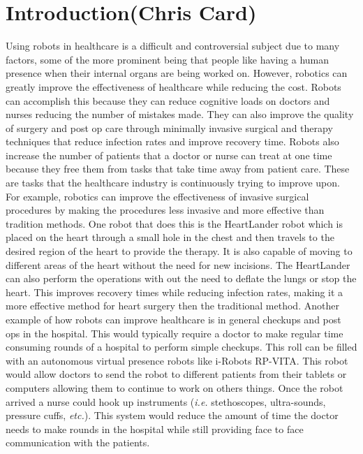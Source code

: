 \documentclass[11pt,conference]{IEEEtran}
\begin{document}
\section{Introduction(Chris Card)}

Using robots in healthcare is a difficult and controversial subject due to many factors, some of the more prominent being that people like having a human presence when their internal organs are being worked on.  However, robotics can greatly improve the effectiveness of healthcare while reducing the cost.  Robots can accomplish this because they can reduce cognitive loads on doctors and nurses reducing the number of 
mistakes made.  They can also improve the quality of surgery and post op care through minimally invasive surgical and therapy techniques that reduce infection rates and improve recovery time.  Robots also increase the number of patients that a doctor or nurse can treat at one time because they free them from tasks that take time away from patient care.  These are tasks that the healthcare industry is continuously trying to improve upon.
\newline
\indent For example, robotics can improve the effectiveness of invasive surgical procedures by making the procedures less invasive and more effective than tradition methods.  One robot that does this is the HeartLander robot which is placed on the heart through a small hole in 
the chest and then travels to the desired region of the heart to provide the therapy. It is also capable of moving to different areas of the heart without the need for new incisions.  The HeartLander can also perform the 
operations with out the need to deflate the lungs or stop the heart.  This improves recovery times while reducing infection rates, making it a more effective method for heart surgery then the traditional method.  
\newline
\indent Another example of how robots can improve healthcare is in general checkups and post ops in the hospital.  This would typically require a doctor to make regular time consuming rounds of a hospital to perform simple checkups.  This roll can be filled with an autonomous virtual presence robots like i-Robots RP-VITA.  This robot would allow doctors to send the robot to different patients from their tablets or computers allowing them to continue to work on others things.  Once the robot arrived a nurse could hook up instruments (\textit{i.e.} stethoscopes, ultra-sounds, pressure cuffs, \textit{etc.}).  This system would reduce the amount of time the doctor needs to make rounds in the hospital while still providing face to face communication with the patients.
\end{document}
